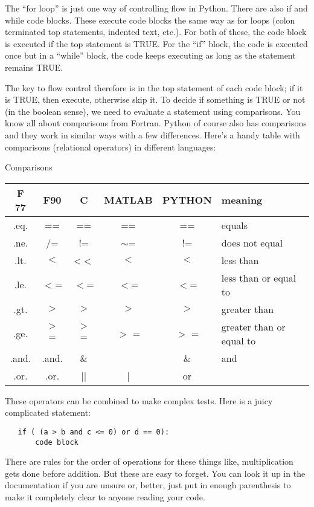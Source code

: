{The ``for loop'' is just one way of controlling flow in Python.  There are also {\color{blue}if}  and  {\color{blue}while} code blocks.  These execute code blocks  the same way as for loops (colon terminated top statements, indented text, etc.).  For both of these, the code block is executed if the top statement is  TRUE.  For the ``if'' block, the code is executed once but in a ``while'' block, the code keeps executing as long as the statement remains TRUE.  

The key to flow control therefore is in the top statement of each code block;  if it is TRUE, then execute, otherwise skip it.  To decide if something is TRUE or not (in the boolean sense), we need to evaluate a statement using comparisons.  You know all about comparisons from Fortran.  Python of course also has comparisons and they work in similar ways with a few differences. Here's a handy table with comparisons (relational operators) in different languages:

\centerline{Comparisons}
\begin{tabular}{cccccl}
\hline
F 77  &   F90    &  C    & MATLAB  & PYTHON  & meaning\\
\hline
.eq.  &  ==   &   ==    &  ==  &     ==   &  equals\\
.ne. &   /=  &    !=   &   $\sim$=    &   !=  &   does not equal\\
.lt.  &  $<$   &    <$<$  &     $<$  &   $<$  &    less than\\
.le.  &  $<$= &     $<$=   &  $<$=   &    $<$=  &   less than or equal to\\
.gt.  & $>$ &      $>$    &   $>$    & $>$   &    greater than\\
.ge.  &  $>$ =   &   $>$ =   &  $>$ =  &    $>$ =  &   greater than or equal to\\
.and. & .and. &   \&&    &  \&  &      and\\
.or.  & .or.  &    ||    &  |   &     or \\ 
\hline
\end{tabular}


These operators can be combined to make complex tests.  Here is a juicy complicated statement:

{\singlespacing \color{blue} \begin{verbatim}
   if ( (a > b and c <= 0) or d == 0):
       code block
   \end{verbatim}}
\noindent   
There are rules for the order of operations for these things like, multiplication gets done before addition.   But these are easy to forget.  You can look it up in the documentation if 
you are unsure or, better, just put in enough parenthesis to 
make it completely clear to anyone reading your code.

}
